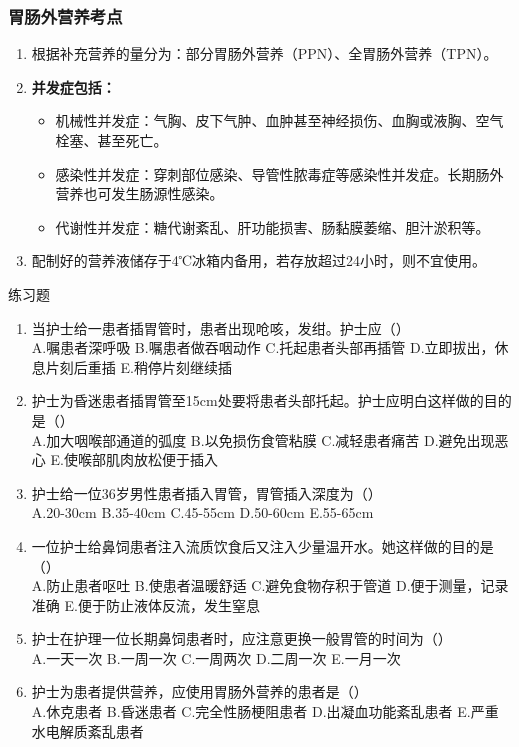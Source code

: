 \documentclass[11pt, a4paper]{ctexart}
\begin{document}
\subsubsection{胃肠外营养考点}
\begin{enumerate}
	\item 根据补充营养的量分为：部分胃肠外营养（PPN）、全胃肠外营养（TPN）。
	\item \textbf{并发症包括：}
	      \begin{itemize}
		      \item 机械性并发症：气胸、皮下气肿、血肿甚至神经损伤、血胸或液胸、空气栓塞、甚至死亡。
		      \item 感染性并发症：穿刺部位感染、导管性脓毒症等感染性并发症。长期肠外营养也可发生肠源性感染。
		      \item 代谢性并发症：糖代谢紊乱、肝功能损害、肠黏膜萎缩、胆汁淤积等。
	      \end{itemize}
	\item 配制好的营养液储存于4℃冰箱内备用，若存放超过24小时，则不宜使用。
\end{enumerate}

\begin{examplebox}{练习题}
	\begin{enumerate}
		\item 当护士给一患者插胃管时，患者出现呛咳，发绀。护士应（\qquad）\\
		      A.嘱患者深呼吸 \quad B.嘱患者做吞咽动作 \quad C.托起患者头部再插管 \quad D.立即拔出，休息片刻后重插 \quad E.稍停片刻继续插
		\item 护士为昏迷患者插胃管至15cm处要将患者头部托起。护士应明白这样做的目的是（\qquad）\\
		      A.加大咽喉部通道的弧度 \quad B.以免损伤食管粘膜 \quad C.减轻患者痛苦 \quad D.避免出现恶心 \quad E.使喉部肌肉放松便于插入
		\item 护士给一位36岁男性患者插入胃管，胃管插入深度为（\qquad）\\
		      A.20-30cm \quad B.35-40cm \quad C.45-55cm \quad D.50-60cm \quad E.55-65cm
		\item 一位护士给鼻饲患者注入流质饮食后又注入少量温开水。她这样做的目的是（\qquad）\\
		      A.防止患者呕吐 \quad B.使患者温暖舒适 \quad C.避免食物存积于管道 \quad D.便于测量，记录准确 \quad E.便于防止液体反流，发生窒息
		\item 护士在护理一位长期鼻饲患者时，应注意更换一般胃管的时间为（\qquad）\\
		      A.一天一次 \quad B.一周一次 \quad C.一周两次 \quad D.二周一次 \quad E.一月一次
		\item 护士为患者提供营养，应使用胃肠外营养的患者是（\qquad）\\
		      A.休克患者 \quad B.昏迷患者 \quad C.完全性肠梗阻患者 \quad D.出凝血功能紊乱患者 \quad E.严重水电解质紊乱患者
	\end{enumerate}
\end{examplebox}
\end{document}
